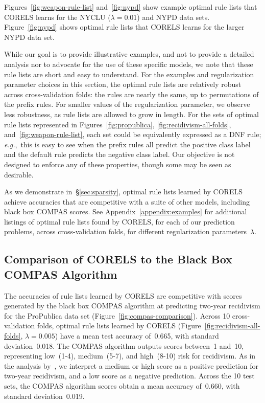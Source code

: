 \documentclass[twoside,11pt]{article}
\def\eg{{\it e.g.},~}
\def\Reg{{\lambda}}
\begin{document}
Figures~\ref{fig:weapon-rule-list} and~\ref{fig:nypd} show example optimal rule lists that
CORELS learns for the NYCLU (${\Reg = 0.01}$) and NYPD data sets.
%
Figure~\ref{fig:nypd} shows optimal rule lists that CORELS learns for the larger NYPD data set.
%

While our goal is to provide illustrative examples, and not to provide a
detailed analysis nor to advocate for the use of these specific models,
we note that these rule lists are short and easy to understand.
%
For the examples and regularization parameter choices in this section,
the optimal rule lists are relatively robust across cross-validation folds:
the rules are nearly the same, up to permutations of the prefix rules.
%
For smaller values of the regularization parameter, we observe less robustness,
as rule lists are allowed to grow in length.
%
For the sets of optimal rule lists represented in Figures~\ref{fig:propublica},
\ref{fig:recidivism-all-folds}, and~\ref{fig:weapon-rule-list},
each set could be equivalently expressed as a DNF rule;
\eg this is easy to see when the prefix rules all predict the positive class label
and the default rule predicts the negative class label.
%
Our objective is not designed to enforce any of these properties,
though some may be seen as desirable.

As we demonstrate in~\S\ref{sec:sparsity},
optimal rule lists learned by CORELS achieve accuracies that are competitive
with a suite of other models, including black box COMPAS scores.
%
See Appendix~\ref{appendix:examples} for additional listings of optimal rule lists found
by CORELS, for each of our prediction problems, across cross-validation folds,
for different regularization parameters~$\Reg$.

\subsection{Comparison of CORELS to the Black Box COMPAS Algorithm}
\label{sec:compas}

The accuracies of rule lists learned by CORELS are competitive with
scores generated by the black box COMPAS algorithm
at predicting two-year recidivism for the ProPublica data set (Figure~\ref{fig:compas-comparison}).
%
Across 10 cross-validation folds, optimal rule lists learned by CORELS
(Figure~\ref{fig:recidivism-all-folds}, ${\Reg = 0.005}$)
have a mean test accuracy of~0.665, with standard deviation~0.018.
%
The COMPAS algorithm outputs scores between~1 and~10,
representing low~(1-4), medium~(5-7), and high~(8-10) risk for recidivism.
%
As in the analysis by~\citet{LarsonMaKiAn16}, we interpret a medium or high score
as a positive prediction for two-year recidivism, and a low score as a negative prediction.
%
Across the 10 test sets, the COMPAS algorithm scores obtain
a mean accuracy of~0.660, with standard deviation~0.019.
\end{document}
